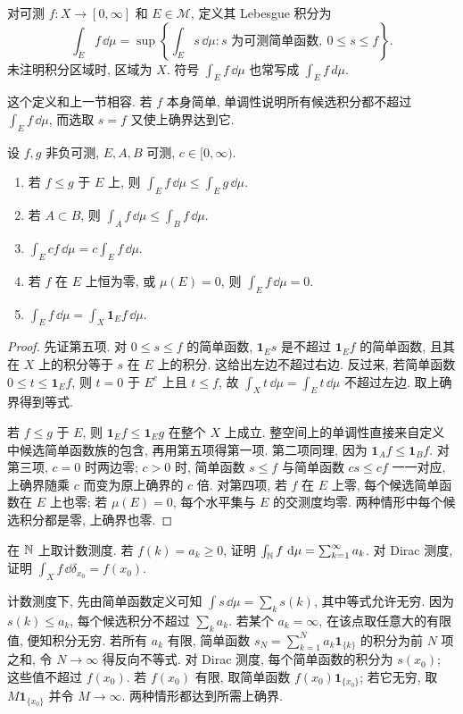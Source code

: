 \begin{definition}\label{ra:c2:positive-integral}
对可测 $f:X\to[0,\infty]$ 和 $E\in\mathcal M$, 定义其 Lebesgue 积分为
\[
 \int_E f\,\dd\mu
 =\sup\left\{\int_Es\,\dd\mu:
  s\text{ 为可测简单函数},\ 0\le s\le f\right\}.
\]
未注明积分区域时, 区域为 $X$. 符号 $\int_E f\,\dd\mu$ 也常写成 $\int_E f\,d\mu$.
\end{definition}
这个定义和上一节相容. 若 $f$ 本身简单, 单调性说明所有候选积分都不超过 $\int_Ef\,\dd\mu$, 而选取 $s=f$ 又使上确界达到它.

\begin{proposition}\label{ra:c2:positive-basic}
设 $f,g$ 非负可测, $E,A,B$ 可测, $c\in[0,\infty)$.
\begin{enumerate}
\item 若 $f\le g$ 于 $E$ 上, 则 $\int_E f\,\dd\mu\le\int_Eg\,\dd\mu$.
\item 若 $A\subset B$, 则 $\int_Af\,\dd\mu\le\int_Bf\,\dd\mu$.
\item $\int_Ecf\,\dd\mu=c\int_Ef\,\dd\mu$.
\item 若 $f$ 在 $E$ 上恒为零, 或 $\mu(E)=0$, 则 $\int_E f\,\dd\mu=0$.
\item $\int_E f\,\dd\mu=\int_X\mathbf1_Ef\,\dd\mu$.
\end{enumerate}
\end{proposition}
\begin{proof}
先证第五项. 对 $0\le s\le f$ 的简单函数, $\mathbf1_Es$ 是不超过 $\mathbf1_Ef$ 的简单函数, 且其在 $X$ 上的积分等于 $s$ 在 $E$ 上的积分. 这给出左边不超过右边. 反过来, 若简单函数 $0\le t\le\mathbf1_Ef$, 则 $t=0$ 于 $E^c$ 上且 $t\le f$, 故 $\int_Xt\,\dd\mu=\int_Et\,\dd\mu$ 不超过左边. 取上确界得到等式.

若 $f\le g$ 于 $E$, 则 $\mathbf1_Ef\le\mathbf1_Eg$ 在整个 $X$ 上成立. 整空间上的单调性直接来自定义中候选简单函数族的包含, 再用第五项得第一项. 第二项同理, 因为 $\mathbf1_Af\le\mathbf1_Bf$. 对第三项, $c=0$ 时两边零; $c>0$ 时, 简单函数 $s\le f$ 与简单函数 $cs\le cf$ 一一对应, 上确界随乘 $c$ 而变为原上确界的 $c$ 倍. 对第四项, 若 $f$ 在 $E$ 上零, 每个候选简单函数在 $E$ 上也零; 若 $\mu(E)=0$, 每个水平集与 $E$ 的交测度均零. 两种情形中每个候选积分都是零, 上确界也零.
\end{proof}

\begin{example}
在 $\mathbb N$ 上取计数测度. 若 $f(k)=a_k\ge0$, 证明 $\int_\mathbb N f\,\,\mathrm d\mu=\sum_{k=1}^{\infty}a_k$. 对 Dirac 测度, 证明 $\int_Xf\,\dd\delta_{x_0}=f(x_0)$.
\end{example}
\begin{solution}
计数测度下, 先由简单函数定义可知 $\int s\,\dd\mu=\sum_k s(k)$, 其中等式允许无穷. 因为 $s(k)\le a_k$, 每个候选积分不超过 $\sum_k a_k$. 若某个 $a_k=\infty$, 在该点取任意大的有限值, 便知积分无穷. 若所有 $a_k$ 有限, 简单函数 $s_N=\sum_{k=1}^{N}a_k\mathbf1_{\{k\}}$ 的积分为前 $N$ 项之和, 令 $N\to\infty$ 得反向不等式. 对 Dirac 测度, 每个简单函数的积分为 $s(x_0)$; 这些值不超过 $f(x_0)$. 若 $f(x_0)$ 有限, 取简单函数 $f(x_0)\mathbf1_{\{x_0\}}$; 若它无穷, 取 $M\mathbf1_{\{x_0\}}$ 并令 $M\to\infty$. 两种情形都达到所需上确界.
\end{solution}

